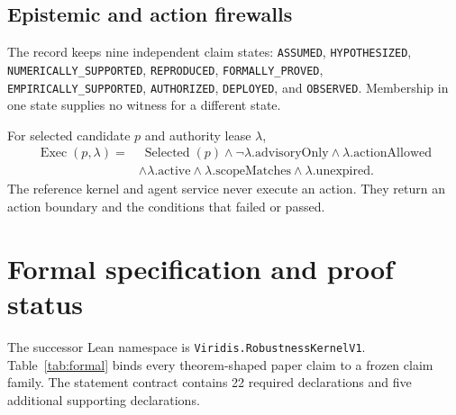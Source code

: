 \documentclass[10pt]{article}
\begin{document}
\subsection{Epistemic and action firewalls}

The record keeps nine independent claim states: \texttt{ASSUMED},
\texttt{HYPOTHESIZED}, \texttt{NUMERICALLY\_SUPPORTED}, \texttt{REPRODUCED},
\texttt{FORMALLY\_PROVED}, \texttt{EMPIRICALLY\_SUPPORTED},
\texttt{AUTHORIZED}, \texttt{DEPLOYED}, and \texttt{OBSERVED}. Membership in
one state supplies no witness for a different state.

For selected candidate $p$ and authority lease $\lambda$,
\begin{align}
\operatorname{Exec}(p,\lambda)=&\ \operatorname{Selected}(p)
\wedge\neg\lambda.\mathrm{advisoryOnly}
\wedge\lambda.\mathrm{actionAllowed}\nonumber\\
&\wedge\lambda.\mathrm{active}
\wedge\lambda.\mathrm{scopeMatches}
\wedge\lambda.\mathrm{unexpired}.
\label{eq:authority}
\end{align}
The reference kernel and agent service never execute an action. They return an
action boundary and the conditions that failed or passed.

\section{Formal specification and proof status}

The successor Lean namespace is
\texttt{Viridis.RobustnessKernelV1}. Table~\ref{tab:formal} binds every
theorem-shaped paper claim to a frozen claim family. The statement contract
contains 22 required declarations and five additional supporting declarations.
\end{document}
